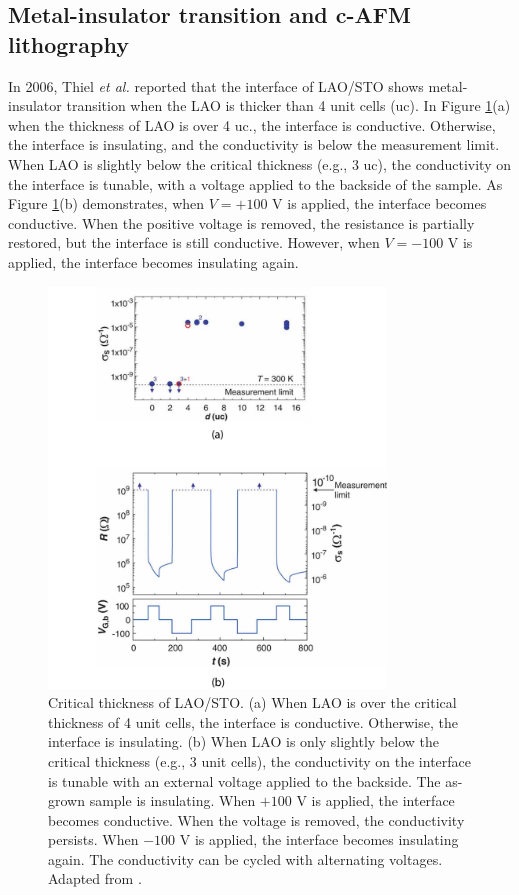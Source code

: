 \documentclass[pdflatex, sectionletters, 12pt, final, phd]{pittetd}    %
\begin{document}
\subsection{Metal-insulator transition and c-AFM lithography}
\label{SEC:WaterCycle}

In 2006, Thiel \textit{et al.} \cite{thiel2006tunable} reported that the interface of LAO/STO shows metal-insulator transition when the LAO is thicker than 4 unit cells (uc). In Figure \ref{FIG:CriticalThickness}(a) when the thickness of LAO is over 4 uc., the interface is conductive. Otherwise, the interface is insulating, and the conductivity is below the measurement limit. When LAO is slightly below the critical thickness (e.g., 3 uc), the conductivity on the interface is tunable, with a voltage applied to the backside of the sample. As Figure \ref{FIG:CriticalThickness}(b) demonstrates, when $V = +100$ V is applied, the interface becomes conductive. When the positive voltage is removed, the resistance is partially restored, but the interface is still conductive. However, when $V = -100$ V is applied, the interface becomes insulating again. 

\begin{figure}[p]
	\centering
	\includegraphics[width=0.8\textwidth]{Drawing/CriticalThickness.pdf}
	\caption[Critical thickness of LAO/STO]{Critical thickness of LAO/STO. (a) When LAO is over the critical thickness of 4 unit cells, the interface is conductive. Otherwise, the interface is insulating. (b) When LAO is only slightly below the critical thickness (e.g., 3 unit cells), the conductivity on the interface is tunable with an external voltage applied to the backside. The as-grown sample is insulating. When $+100$ V is applied, the interface becomes conductive. When the voltage is removed, the conductivity persists. When $-100$ V is applied, the interface becomes insulating again. The conductivity can be cycled with alternating voltages. Adapted from \cite{thiel2006tunable}.}
	\label{FIG:CriticalThickness}
\end{figure}
\end{document}
